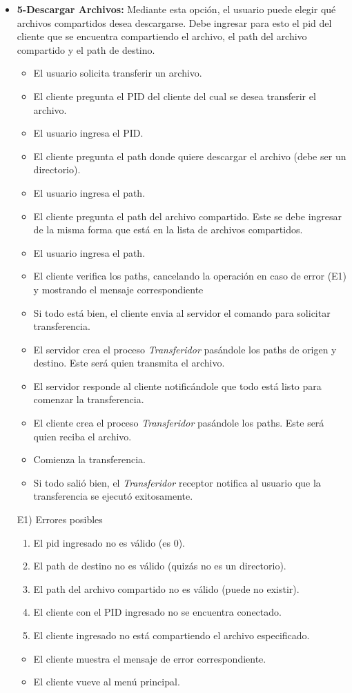 \documentclass[a4paper,10pt]{article}
\begin{document}
\begin{itemize}
                \item \textbf{5-Descargar Archivos:} Mediante esta opci\'on, el usuario puede elegir qu\'e archivos compartidos desea descargarse. Debe ingresar
				para esto el pid del cliente que se encuentra compartiendo el archivo, el path del archivo compartido y el path de destino.
				
                \begin{itemize}
			\item El usuario solicita transferir un archivo.
			\item El cliente pregunta el PID del cliente del cual se desea transferir el archivo.
			\item El usuario ingresa el PID.
			\item El cliente pregunta el path donde quiere descargar el archivo (debe ser un directorio).
			\item El usuario ingresa el path.
			\item El cliente pregunta el path del archivo compartido. Este se debe ingresar de la misma forma que est\'a en la lista de archivos compartidos.
			\item El usuario ingresa el path.
			\item El cliente verifica los paths, cancelando la operaci\'on en caso de error (E1) y mostrando el mensaje correspondiente
			\item Si todo est\'a bien, el cliente envia al servidor el comando para solicitar transferencia.
			\item El servidor crea el proceso \emph{Transferidor} pas\'andole los paths de origen y destino. Este ser\'a quien transmita el archivo.
			\item El servidor responde al cliente notific\'andole que todo est\'a listo para comenzar la transferencia.
			\item El cliente crea el proceso \emph{Transferidor} pas\'andole los paths. Este ser\'a quien reciba el archivo.
			\item Comienza la transferencia.
			\item Si todo sali\'o bien, el \emph{Transferidor} receptor notifica al usuario que la transferencia se ejecut\'o exitosamente.
                \end{itemize}
		E1) Errores posibles
		\begin{enumerate}
			\item El pid ingresado no es v\'alido (es 0).
			\item El path de destino no es v\'alido (quiz\'as no es un directorio).
			\item El path del archivo compartido no es v\'alido (puede no existir).
			\item El cliente con el PID ingresado no se encuentra conectado.
			\item El cliente ingresado no est\'a compartiendo el archivo especificado.
		\end{enumerate}
		\begin{itemize}
			\item El cliente muestra el mensaje de error correspondiente.
			\item El cliente vueve al men\'u principal.
		\end{itemize}


\end{itemize}
\end{document}
